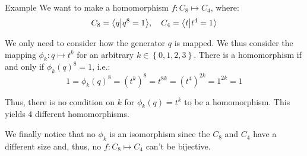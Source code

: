 \documentclass[a4paper]{article}
\begin{document}
\begin{parag}{Example}
    We want to make a homomorphism $f: C_8 \mapsto C_4$, where: 
    \[C_8 = \braket{q}{q^8 = 1}, \mathspace C_4 = \braket{t}{t^4 = 1}\]
    
    We only need to consider how the generator $q$ is mapped. We thus consider the mapping $\phi_k: q \mapsto t^k$ for an arbitrary $k \in \left\{0, 1, 2, 3\right\}$. There is a homomorphism if and only if $\phi_k\left(q\right)^8 = 1$, i.e.:
    \[1 = \phi_k\left(q\right)^8 = \left(t^k\right)^8 = t ^{8k} = \left(t^4\right)^{2k} = 1^{2k} = 1\]
    
    Thus, there is no condition on $k$ for $\phi_k\left(q\right) = t^k$ to be a homomorphism. This yields 4 different homomorphisms.

    We finally notice that no $\phi_k$ is an isomorphism since the $C_8$ and $C_4$ have a different size and, thus, no $f: C_8 \mapsto C_4$ can't be bijective.
\end{parag}
\end{document}
